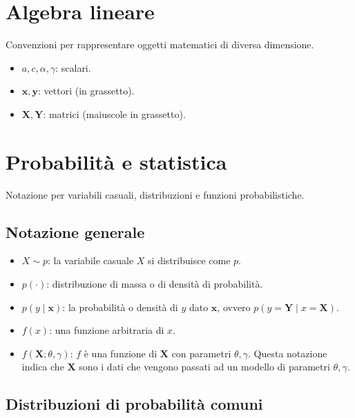 \documentclass[
  italian,
  letterpaper,
  a4paper,
  11pt,
  open=any]{scrbook}
\providecommand{\tightlist}{%
  \setlength{\itemsep}{0pt}\setlength{\parskip}{0pt}}
\theoremstyle{plain}
\theoremstyle{definition}
\theoremstyle{definition}
\theoremstyle{remark}
\begin{document}
\section{Algebra lineare}\label{algebra-lineare}

Convenzioni per rappresentare oggetti matematici di diversa dimensione.

\begin{itemize}
\tightlist
\item
  \(a, c, \alpha, \gamma\): scalari.
\item
  \(\boldsymbol{x}, \boldsymbol{y}\): vettori (in grassetto).
\item
  \(\boldsymbol{X}, \boldsymbol{Y}\): matrici (maiuscole in grassetto).
\end{itemize}

\section{Probabilità e statistica}\label{probabilituxe0-e-statistica}

Notazione per variabili casuali, distribuzioni e funzioni
probabilistiche.

\subsection{Notazione generale}\label{notazione-generale}

\begin{itemize}
\tightlist
\item
  \(X \sim p\): la variabile casuale \(X\) si distribuisce come \(p\).
\item
  \(p(\cdot)\): distribuzione di massa o di densità di probabilità.
\item
  \(p(y \mid \boldsymbol{x})\): la probabilità o densità di \(y\) dato
  \(\boldsymbol{x}\), ovvero
  \(p(y = \boldsymbol{Y} \mid x = \boldsymbol{X})\).
\item
  \(f(x)\): una funzione arbitraria di \(x\).
\item
  \(f(\boldsymbol{X}; \theta, \gamma)\): \(f\) è una funzione di
  \(\boldsymbol{X}\) con parametri \(\theta, \gamma\). Questa notazione
  indica che \(\boldsymbol{X}\) sono i dati che vengono passati ad un
  modello di parametri \(\theta, \gamma\).
\end{itemize}

\subsection{Distribuzioni di probabilità
comuni}\label{distribuzioni-di-probabilituxe0-comuni}
\end{document}
